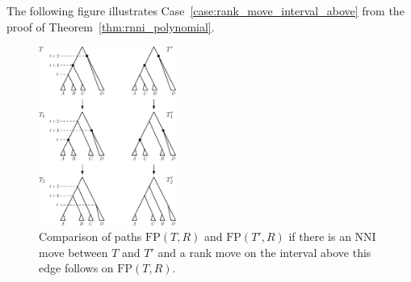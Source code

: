 \documentclass[11pt]{amsart}
\newcommand{\nni}{\mathrm{NNI}}
\newcommand{\fp}{\mathrm{FP}}
\begin{document}
The following figure illustrates Case~\ref{case:rank_move_interval_above} from the proof of Theorem~\ref{thm:rnni_polynomial}.

\begin{figure}[ht]
	\centering
	\includegraphics[width=0.4\textwidth]{thm_fp_nni3}
	\caption{Comparison of paths $\fp(T, R)$ and $\fp(T', R)$ if there is an $\nni$ move between $T$ and $T'$ and a rank move on the interval above this edge follows on $\fp(T, R)$.}
	\label{fig:thm_fp_nni3}
\end{figure}

\newpage
\printbibliography
\end{document}
